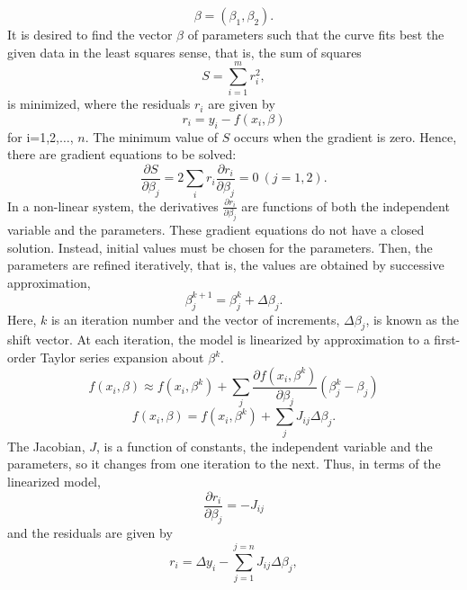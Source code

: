 \documentclass[a4paper,10pt]{report}
\begin{document}
\begin{equation}
\beta = (\beta_1, \beta_2).
\end{equation}
It is desired to find the vector $\beta$ of parameters such that the curve fits best the given data in the least squares sense, that is, the sum of squares
\begin{equation}
    S=\sum_{i=1}^{m}r_i^2 ,
\end{equation}
is minimized, where the residuals $r_i$ are given by
\begin{equation}
    r_i = y_i - f(x_i,\beta)
\end{equation}
for i=1,2,$\dots$, $n$.
\newline
The minimum value of $S$ occurs when the gradient is zero. Hence, there are gradient equations to be solved:
\begin{equation}
    \frac{\partial S}{\partial \beta_j}=2\sum_i r_i\frac{\partial r_i}{\partial \beta_j}=0 \ (j=1,2).
\end{equation}
In a non-linear system, the derivatives $\frac{\partial r_i}{\partial \beta_j}$ are functions of both the independent variable and the parameters. These gradient equations do not have a closed solution. Instead, initial values must be chosen for the parameters. Then, the parameters are refined iteratively, that is, the values are obtained by successive approximation,
\begin{equation}
    \beta_j^{k+1}=\beta^k_j+\Delta \beta_j.
\end{equation}
Here, $k$ is an iteration number and the vector of increments, $\Delta \beta_j$, is known as the shift vector. At each iteration,
the model is linearized by approximation to a first-order Taylor series expansion about $\beta^k$.
\begin{equation}
    f(x_i,\beta)\approx f(x_i,\beta^k) +\sum_j \frac{\partial f(x_i, \beta^k)}{\partial \beta_j} \left(\beta^k_j -\beta_j \right)
\end{equation}
\begin{equation}
 f(x_i,\beta) =f(x_i, \beta^k)+\sum_j J_{ij} \Delta\beta_j.
\end{equation}
The Jacobian, $J$, is a function of constants, the independent variable and the parameters, so it changes from one iteration to the
next. Thus, in terms of the linearized model,
\begin{equation}
\frac{\partial r_i}{\partial \beta_j}=-J_{ij}
\end{equation}
and the residuals are given by
\begin{equation}
    r_i=\Delta y_i- \sum_{j=1}^{j=n} J_{ij}\Delta\beta_j,
\end{equation}
\end{document}
